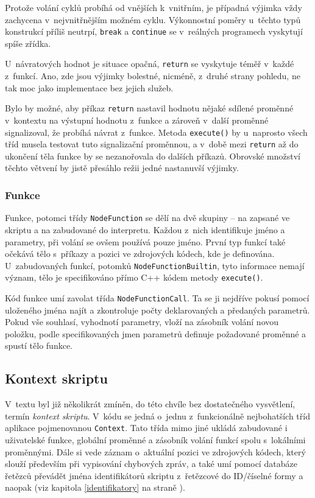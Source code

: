\documentclass[11pt,twoside,a4paper]{book}
\begin{document}
Protože volání cyklů probíhá od vnějších k~vnitřním, je případná výjimka vždy zachycena v~nejvnitřnějším možném cyklu. Výkonnostní poměry u~těchto typů konstrukcí příliš neutrpí, \texttt{break} a \texttt{continue} se v~reálných programech vyskytují spíše zřídka.

U~návratových hodnot je situace opačná, \texttt{return} se vyskytuje téměř v~každé z~funkcí. Ano, zde jsou výjimky bolestné, nicméně, z~druhé strany pohledu, ne tak moc jako implementace bez jejich služeb.

Bylo by možné, aby příkaz \texttt{return} nastavil hodnotu nějaké sdílené proměnné v~kontextu na výstupní hodnotu z~funkce a zároveň v~další proměnné signalizoval, že probíhá návrat z~funkce. Metoda \texttt{execute()} by u~naprosto všech tříd musela testovat tuto signalizační proměnnou, a v~době mezi \texttt{return} až do ukončení těla funkce by se nezanořovala do dalších příkazů. Obrovské množství těchto větvení by jistě přesáhlo režii jedné nastanuvší výjimky.


\subsubsection{Funkce}

Funkce, potomci třídy \texttt{NodeFunction} se dělí na dvě skupiny -- na zapsané ve skriptu a na zabudované do interpretu. Každou z~nich identifikuje jméno a parametry, při volání se ovšem používá pouze jméno. První typ funkcí také očekává tělo s~příkazy a pozici ve zdrojových kódech, kde je definována. U~zabudovaných funkcí, potomků \texttt{Node\-Function\-Builtin}, tyto informace nemají význam, tělo je specifikováno přímo C++ kódem metody \texttt{execute()}.

Kód funkce umí zavolat třída \texttt{NodeFunctionCall}. Ta se ji nejdříve pokusí pomocí uloženého jména najít a zkontroluje počty deklarovaných a předaných parametrů. Pokud vše souhlasí, vyhodnotí parametry, vloží na zásobník volání novou položku, podle specifikovaných jmen parametrů definuje požadované proměnné a spustí tělo funkce.


\subsection{Kontext skriptu}

V~textu byl již několikrát zmíněn, do této chvíle bez dostatečného vysvětlení, termín \textit{kontext skriptu}. V~kódu se jedná o~jednu z~funkcionálně nejbohatších tříd aplikace pojmenovanou \texttt{Context}. Tato třída mimo jiné ukládá zabudované i uživatelské funkce, globální proměnné a zásobník volání funkcí spolu s~lokálními proměnnými. Dále si vede záznam o~aktuální pozici ve zdrojových kódech, který slouží především při vypisování chybových zpráv, a také umí pomocí databáze řetězců převádět jména identifikátorů skriptu z~řetězcové do ID/číselné formy a naopak (viz kapitola \ref{identifikatory} na straně \pageref{identifikatory}).
\end{document}
